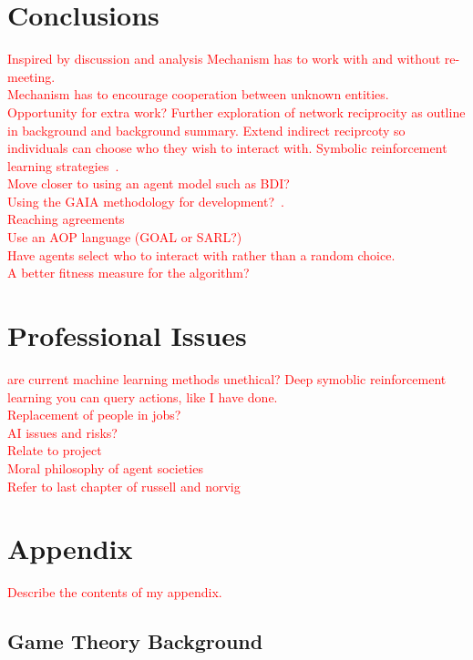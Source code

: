 \documentclass[]{final_report}
\begin{document}
\chapter{Conclusions}
\textcolor{red}{Inspired by discussion and analysis}
\textcolor{red}{Mechanism has to work with and without re-meeting.\\
Mechanism has to encourage cooperation between unknown entities.\\
Opportunity for extra work? Further exploration of network reciprocity as outline in background and background summary. Extend indirect reciprcoty so individuals can choose who they wish to interact with. Symbolic reinforcement learning strategies~\cite{harper2017reinforcement}.\\
Move closer to using an agent model such as BDI?\\
Using the GAIA methodology for development?~\cite{wooldridge2000gaia}.\\
Reaching agreements\\
Use an AOP language (GOAL or SARL?)\\
Have agents select who to interact with rather than a random choice.\\
A better fitness measure for the algorithm?}


\newpage
{}

\label{endpage}

\chapter{Professional Issues}
\textcolor{red}{are current machine learning methods unethical? Deep symoblic reinforcement learning you can query actions, like I have done.\\
Replacement of people in jobs?\\
AI issues and risks?\\
Relate to project\\
Moral philosophy of agent societies\\
Refer to last chapter of russell and norvig}



\chapter{Appendix}
\label{appendix}
\textcolor{red}{Describe the contents of my appendix.}
\section{Game Theory Background}
\end{document}
